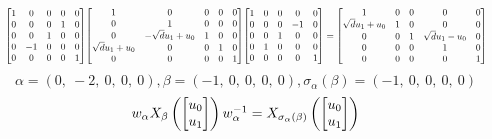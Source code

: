 \documentclass[11pt]{article}
\theoremstyle{definition}
\begin{document}
\[
\scaletoalign{\textwidth}{{\left[\begin{matrix}1 & 0 & 0 & 0 & 0\\0 & 0 & 0 & 1 & 0\\0 & 0 & 1 & 0 & 0\\0 & -1 & 0 & 0 & 0\\0 & 0 & 0 & 0 & 1\end{matrix}\right]} {\left[\begin{matrix}1 & 0 & 0 & 0 & 0\\0 & 1 & 0 & 0 & 0\\0 & - \sqrt{d} u_{1} + u_{0} & 1 & 0 & 0\\\sqrt{d} u_{1} + u_{0} & 0 & 0 & 1 & 0\\0 & 0 & 0 & 0 & 1\end{matrix}\right]} {\left[\begin{matrix}1 & 0 & 0 & 0 & 0\\0 & 0 & 0 & -1 & 0\\0 & 0 & 1 & 0 & 0\\0 & 1 & 0 & 0 & 0\\0 & 0 & 0 & 0 & 1\end{matrix}\right]} = {\left[\begin{matrix}1 & 0 & 0 & 0 & 0\\\sqrt{d} u_{1} + u_{0} & 1 & 0 & 0 & 0\\0 & 0 & 1 & \sqrt{d} u_{1} - u_{0} & 0\\0 & 0 & 0 & 1 & 0\\0 & 0 & 0 & 0 & 1\end{matrix}\right]}}
\]
\[
\alpha = \left( 0, \  -2, \  0, \  0, \  0\right), \beta = \left( -1, \  0, \  0, \  0, \  0\right), \sigma_{\alpha}(\beta) = \left( -1, \  0, \  0, \  0, \  0\right)
\]
\[
\scaletoalign{\textwidth}{w_{\alpha} X_{\beta}\left(\left[\begin{matrix}u_{0}\\u_{1}\end{matrix}\right]\right) w_{\alpha}^{-1} = X_{\sigma_{\alpha}\left(\beta\right)}\left(\left[\begin{matrix}u_{0}\\u_{1}\end{matrix}\right]\right)}
\]
\end{document}
